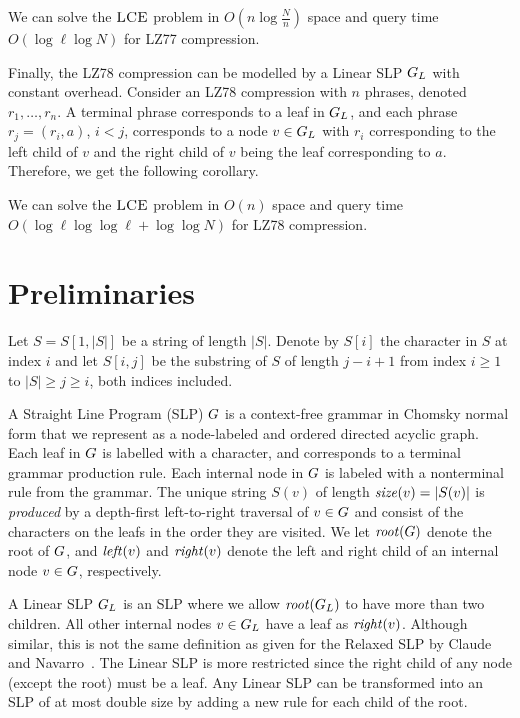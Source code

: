 \begin{corollary}
	We can solve the $\textsc{LCE}$ problem in $O(n \log \frac{N}{n})$ space and query time $O(\log \ell \log N)$ for LZ77 compression.
\end{corollary}

\noindent Finally, the LZ78 compression can be modelled by a Linear SLP $G_L$ with constant overhead. Consider an LZ78 compression with $n$ phrases, denoted $r_1, \ldots, r_n$. A terminal phrase corresponds to a leaf in $G_L$, and each phrase $r_j = (r_i, a)$, $i < j$, corresponds to a node $v \in G_L$ with $r_i$ corresponding to the left child of $v$ and the right child of $v$ being the leaf corresponding to $a$. Therefore, we get the following corollary.

\begin{corollary}
	We can solve the $\textsc{LCE}$ problem in $O(n)$ space and query time $O(\log \ell \log \log \ell + \log \log N)$ for LZ78 compression.
\end{corollary}

\section{Preliminaries}
Let $S = S[1, |S|]$ be a string of length $|S|$. Denote by $S[i]$ the character in $S$ at index $i$ and let $S[i, j]$ be the substring of $S$ of length $j - i+1$ from index $i \geq 1$ to $|S| \geq j \geq i$, both indices included.

A Straight Line Program (SLP) $G$ is a context-free grammar in Chomsky normal form that we represent as a node-labeled and ordered directed acyclic graph. Each leaf in $G$ is labelled with a character, and corresponds to a terminal grammar production rule. Each internal node in $G$ is labeled with a nonterminal rule from the grammar. The unique string $S(v)$ of length $\mathit{size}(v) = |S(v)|$ is \emph{produced} by a depth-first left-to-right traversal of $v \in G$ and consist of the characters on the leafs in the order they are visited. We let $\mathit{root}(G)$ denote the root of $G$, and $\mathit{left}(v)$ and $\mathit{right}(v)$ denote the left and right child of an internal node $v \in G$, respectively.

A Linear SLP $G_L$ is an SLP where we allow $\mathit{root}(G_L)$ to have more than two children. All other internal nodes $v \in G_L$ have a leaf as $\mathit{right}(v)$. Although similar, this is not the same definition as given for the Relaxed SLP by Claude and Navarro~\cite{claude2011self}. The Linear SLP is more restricted since the right child of any node (except the root) must be a leaf. Any Linear SLP can be transformed into an SLP of at most double size by adding a new rule for each child of the root.

